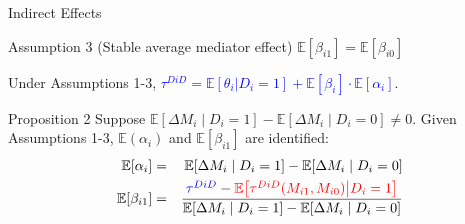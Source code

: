 \documentclass[aspectratio=1610, 9pt]{beamer}
\begin{document}
\begin{frame}{Indirect Effects}

    \begin{block}{Assumption 3 (Stable average mediator effect)}
    $\mathbb E[\beta_{i1}]=\mathbb E[\beta_{i0}]$
\end{block}
\vspace{0.5cm}
Under Assumptions 1-3, 
\textcolor{blue}{$\tau^{DiD}=\mathbb E[\theta_i \vert D_i=1] +\mathbb E[\beta_{i}] \cdot \mathbb E[\alpha_i]$}.

\vspace{0.5cm}

\begin{block}{Proposition 2}
    Suppose $\mathbb{E}[\Delta M_i \mid D_i=1]-\mathbb{E}[\Delta M_i \mid D_i=0] \neq 0$. Given Assumptions 1-3, $\mathbb{E}(\alpha_i)$ and $\mathbb E[\beta_{i1}]$ are identified: \begin{eqnarray*}
    \mathbb{E}[\alpha_i]& = & \mathbb{E}[\Delta M_i \mid D_i=1]-\mathbb{E}[\Delta M_i \mid D_i=0]\\
        \mathbb E[\beta_{i1}] &=& \frac{\textcolor{blue}{\tau^{DiD}}-\textcolor{red}{\mathbb{E}\big[ \tau^{DiD}(M_{i1},M_{i0}) \big| D_i =1\big]} }{\mathbb{E}[\Delta M_i \mid D_i=1]-\mathbb{E}[\Delta M_i \mid D_i=0]}
    \end{eqnarray*}
\end{block}

\end{frame}
\end{document}
